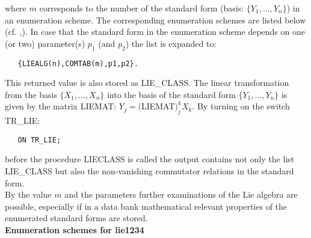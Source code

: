where $m$ corresponds to the number of the standard form (basis:
$\{Y_1,\ldots,Y_n\}$) in an enumeration scheme. The corresponding enumeration
schemes are listed below (cf. \cite{ntz-preprint27/92},\cite{mmpreprint1979}).
In case that the standard form in the enumeration scheme depends on one (or two)
parameter(s) $p_1$ (and $p_2$) the list is expanded to:
\begin{verbatim}
   {LIEALG(n),COMTAB(m),p1,p2}.
\end{verbatim}
This returned value is also stored as LIE\_CLASS. The linear transformation from
the basis $\{X_1,\ldots,X_n\}$ into the basis of the standard form
$\{Y_1,\ldots,Y_n\}$ is given by the matrix LIEMAT:
$Y_j=($LIEMAT$)_j^k X_k$.\newpage
By turning on the switch TR\_LIE:
\begin{verbatim}
   ON TR_LIE;
\end{verbatim}
before the procedure LIECLASS is called the output contains not only the
list LIE\_CLASS but also the non-vanishing commutator relations in the
standard form.\\[0.1cm]
By the value $m$ and the parameters further examinations of the Lie algebra
are possible, especially if in a data bank mathematical relevant properties
of the enumerated standard forms are stored.\\[0.3cm]
{\large\bf Enumeration schemes for lie1234}\\[0.2cm]
